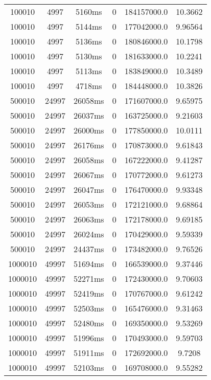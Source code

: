 \documentclass[./main.tex]{subfiles}
\begin{document}
\begin{table}
\begin{tabular}{ c | c | c | c | c | c }
        100010 & 4997 & 5160ms & 0 & 184157000.0 & 10.3662 \\
        100010 & 4997 & 5144ms & 0 & 177042000.0 & 9.96564 \\
        100010 & 4997 & 5136ms & 0 & 180846000.0 & 10.1798 \\
        100010 & 4997 & 5130ms & 0 & 181633000.0 & 10.2241 \\
        \rowcolor{lightgray} 100010 & 4997 & 5113ms & 0 & 183849000.0 & 10.3489 \\
        100010 & 4997 & 4718ms & 0 & 184448000.0 & 10.3826 \\
        \hline
        \rowcolor{lightgray} 500010 & 24997 & 26058ms & 0 & 171607000.0 & 9.65975 \\
        500010 & 24997 & 26037ms & 0 & 163725000.0 & 9.21603 \\
        500010 & 24997 & 26000ms & 0 & 177850000.0 & 10.0111 \\
        500010 & 24997 & 26176ms & 0 & 170873000.0 & 9.61843 \\
        500010 & 24997 & 26058ms & 0 & 167222000.0 & 9.41287 \\
        500010 & 24997 & 26067ms & 0 & 170772000.0 & 9.61273 \\
        500010 & 24997 & 26047ms & 0 & 176470000.0 & 9.93348 \\
        500010 & 24997 & 26053ms & 0 & 172121000.0 & 9.68864 \\
        500010 & 24997 & 26063ms & 0 & 172178000.0 & 9.69185 \\
        500010 & 24997 & 26024ms & 0 & 170429000.0 & 9.59339 \\
        500010 & 24997 & 24437ms & 0 & 173482000.0 & 9.76526 \\
        \hline
        1000010 & 49997 & 51694ms & 0 & 166539000.0 & 9.37446 \\
        1000010 & 49997 & 52271ms & 0 & 172430000.0 & 9.70603 \\
        1000010 & 49997 & 52419ms & 0 & 170767000.0 & 9.61242 \\
        1000010 & 49997 & 52503ms & 0 & 165476000.0 & 9.31463 \\
        1000010 & 49997 & 52480ms & 0 & 169350000.0 & 9.53269 \\
        \rowcolor{lightgray} 1000010 & 49997 & 51996ms & 0 & 170493000.0 & 9.59703 \\
        1000010 & 49997 & 51911ms & 0 & 172692000.0 & 9.7208 \\
        1000010 & 49997 & 52103ms & 0 & 169708000.0 & 9.55282 \\

\end{tabular}
\end{table}
\end{document}
